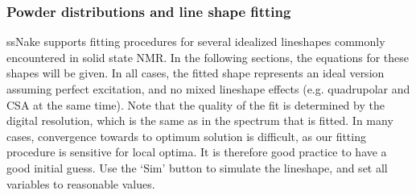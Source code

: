 \documentclass[11pt,a4paper]{article}
\begin{document}
\subsubsection*{Powder distributions and line shape fitting}
ssNake supports fitting procedures for several idealized lineshapes commonly encountered in solid
state NMR. In the following sections, the equations for these shapes will be given. In all cases,
the fitted shape represents an ideal version assuming perfect excitation, and no mixed lineshape
effects (e.g. quadrupolar and CSA at the same time). Note that the quality of the fit is determined
by the digital resolution, which is the same as in the spectrum that is fitted. In many cases,
convergence towards to optimum solution is difficult, as our fitting procedure is sensitive for
local optima. It is therefore good practice to have a good initial guess. Use the `Sim' button to
simulate the lineshape, and set all variables to reasonable values.

\end{document}
